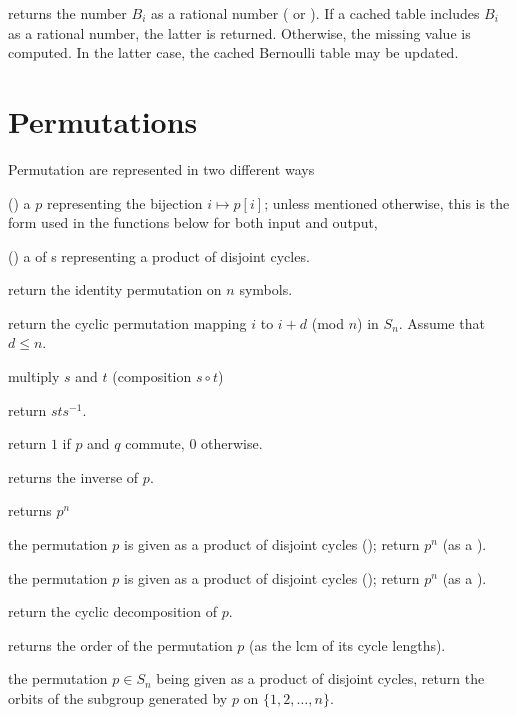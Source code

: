  returns the  number $B_i$ as a
rational number ( or ). If a cached table includes $B_i$
as a rational number, the latter is returned. Otherwise, the missing value is
computed. In the latter case, the cached Bernoulli table may be updated.

\section{Permutations }

\noindent Permutation are represented in two different ways

\item () a  $p$ representing the bijection $i\mapsto
p[i]$; unless mentioned otherwise, this is the form used in the functions
below for both input and output,

\item () a  of s representing a product of
disjoint cycles.

 return the identity permutation on $n$
symbols.

 return the cyclic permutation mapping
$i$ to $i+d$ (mod $n$) in $S_n$. Assume that $d \leq n$.

 multiply $s$ and $t$ (composition $s\circ t$)

 return $sts^{-1}$.

 return $1$ if $p$ and $q$ commute, 0
otherwise.

 returns the inverse of $p$.

 returns $p^n$

 the permutation $p$ is given as
a product of disjoint cycles (); return $p^n$ (as a ).

 the permutation $p$ is given as
a product of disjoint cycles (); return $p^n$ (as a ).

 return the cyclic decomposition of $p$.

 returns the order of the permutation $p$
(as the lcm of its cycle lengths).

 the permutation $p\in S_n$ being
given as a product of disjoint cycles, return the orbits of the subgroup
generated by $p$ on $\{1,2,\ldots,n\}$.

